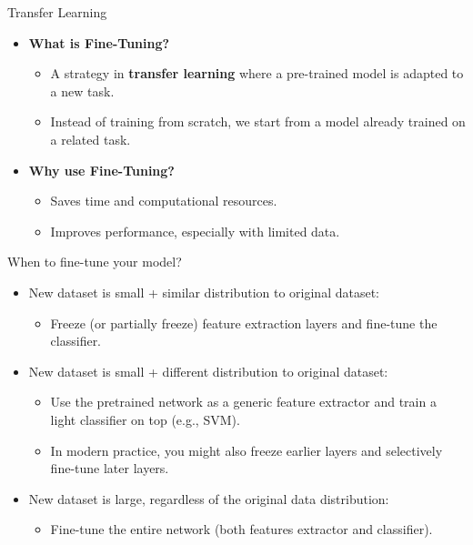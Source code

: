 \documentclass[10pt]{beamer}
\theoremstyle{remark}
\theoremstyle{definition}
\begin{document}
\begin{frame}[allowframebreaks]{Transfer Learning}
\begin{itemize}
    \item \textbf{What is Fine-Tuning?}  
    \begin{itemize}
        \item A strategy in \textbf{transfer learning} where a pre-trained model is adapted to a new task.
        \item Instead of training from scratch, we start from a model already trained on a related task.
    \end{itemize}
    \item \textbf{Why use Fine-Tuning?}  
    \begin{itemize}
        \item Saves time and computational resources.
        \item Improves performance, especially with limited data.
    \end{itemize}
\end{itemize}
\end{frame}


\begin{frame}[allowframebreaks]{When to fine-tune your model?}
    \begin{itemize}
        \item New dataset is small + similar distribution to original dataset:
        \begin{itemize}
            \item Freeze (or partially freeze) feature extraction layers and fine-tune the classifier.
        \end{itemize}

        \item New dataset is small + different distribution to original dataset:
        \begin{itemize}
            \item Use the pretrained network as a generic feature extractor and train a light classifier on top (e.g., SVM).
            \item In modern practice, you might also freeze earlier layers and selectively fine-tune later layers.
        \end{itemize}
        \item New dataset is large, regardless of the original data distribution:
        \begin{itemize}
            \item Fine-tune the entire network (both features extractor and classifier).
        \end{itemize}
    \end{itemize}
\end{frame}
\end{document}

